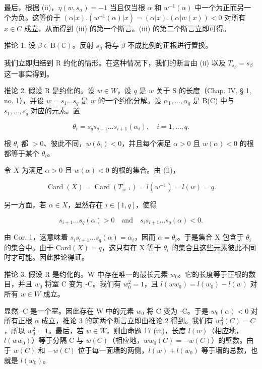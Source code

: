 最后，根据 (ii)，\(\eta(w,s_{\alpha})=-1\) 当且仅当根 \(\alpha\) 和 \(w^{-1}(\alpha)\) 中一个为正而另一个为负。这等价于 \((\alpha|x).(w^{-1}(\alpha)|x)=(\alpha|x).( \alpha|w(x))<0\) 对所有 \(x\in C\) 成立，从而得到 (iii) 的第一个断言。(iii) 的第二个断言立即可得。

推论 1. 设 \(\beta \in \mathrm{B}(\mathbb{C})\)。反射 \(s_{\beta}\) 将与 \(\beta\) 不成比例的正根进行置换。

我们立即归结到 R 约化的情形。在这种情况下，我们的断言由 (ii) 以及 \(T_{s_{\beta}} = s_{\beta}\) 这一事实得到。

推论 2. 假设 R 是约化的。设 \(w \in W\)，设 \(q\) 是 \(w\) 关于 S 的长度（Chap. IV, § 1, no. 1），并设 \(w = s_1 \ldots s_q\) 是 \(w\) 的一个约化分解。设 \(\alpha_1, \ldots, \alpha_q\) 是 B(C) 中与 \(s_1, \ldots, s_q\) 对应的元素。置

\[
\theta_ {i} = s _ {q} s _ {q - 1} \dots s _ {i + 1} (\alpha_ {i}), \quad i = 1, \dots , q.
\]

根 \(\theta_{i}\) 都 \(>0\)、彼此不同，\(w(\theta_{i}) < 0\)，并且每个满足 \(\alpha > 0\) 且 \(w(\alpha) < 0\) 的根都等于某个 \(\theta_{i}\)。

令 \(X\) 为满足 \(\alpha > 0\) 且 \(w(\alpha) < 0\) 的根的集合。由 (ii)，

\[
\operatorname{Card} (X) = \operatorname{Card} \left(T _ {w ^ {- 1}}\right) = l \left(w ^ {- 1}\right) = l (w) = q.
\]

另一方面，若 \(\alpha \in X\)，显然存在 \(i \in [1, q]\)，使得

\[
s _ {i + 1} \ldots s _ {q} (\alpha) > 0 \quad \text {and} \quad s _ {i} s _ {i + 1} \ldots s _ {q} (\alpha) <   0.
\]

由 Cor. 1，这意味着 \(s_i s_{i+1} \ldots s_q(\alpha) = \alpha_i\)，因而 \(\alpha = \theta_i\)。于是集合 X 包含于 \(\theta_i\) 的集合中。由于 \(\text{Card}(X) = q\)，这只有在 X 等于 \(\theta_i\) 的集合且这些元素彼此不同时才可能。因此推论得证。

推论 3. 假设 R 是约化的。W 中存在唯一的最长元素 \(w_0\)。它的长度等于正根的数目，并且 \(w_0\) 将室 C 变为 -C。我们有 \(w_0^2 = 1\)，且 \(l(ww_0) = l(w_0) - l(w)\) 对所有 \(w \in W\) 成立。

显然 -C 是一个室。因此存在 W 中的元素 \(w_{0}\) 将 C 变为 -C。于是 \(w_{0}(\alpha) < 0\) 对所有正根 \(\alpha\) 成立，推论 3 的前两个断言立即由推论 2 得到。我们有 \(w_{0}^{2}(C) = C\)，所以 \(w_{0}^{2} = 1\)。最后，若 \(w \in W\)，则由命题 17 (iii)，长度 \(l(w)\)（相应地，\(l(ww_{0})\)）等于分隔 C 与 \(w(C)\)（相应地，\(ww_{0}(C) = -w(C)\)）的壁数。由于 \(w(C)\) 和 \(-w(C)\) 位于每一面墙的两侧，\(l(w) + l(w_{0})\) 等于墙的总数，也就是 \(l(w_{0})\)。

